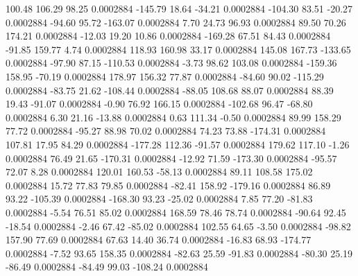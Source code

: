       100.48      106.29       98.25     0.0002884
     -145.79       18.64      -34.21     0.0002884
     -104.30       83.51      -20.27     0.0002884
      -94.60       95.72     -163.07     0.0002884
        7.70       24.73       96.93     0.0002884
       89.50       70.26      174.21     0.0002884
      -12.03       19.20       10.86     0.0002884
     -169.28       67.51       84.43     0.0002884
      -91.85      159.77        4.74     0.0002884
      118.93      160.98       33.17     0.0002884
      145.08      167.73     -133.65     0.0002884
      -97.90       87.15     -110.53     0.0002884
       -3.73       98.62      103.08     0.0002884
     -159.36      158.95      -70.19     0.0002884
      178.97      156.32       77.87     0.0002884
      -84.60       90.02     -115.29     0.0002884
      -83.75       21.62     -108.44     0.0002884
      -88.05      108.68       88.07     0.0002884
       88.39       19.43      -91.07     0.0002884
       -0.90       76.92      166.15     0.0002884
     -102.68       96.47      -68.80     0.0002884
        6.30       21.16      -13.88     0.0002884
        0.63      111.34       -0.50     0.0002884
       89.99      158.29       77.72     0.0002884
      -95.27       88.98       70.02     0.0002884
       74.23       73.88     -174.31     0.0002884
      107.81       17.95       84.29     0.0002884
     -177.28      112.36      -91.57     0.0002884
      179.62      117.10       -1.26     0.0002884
       76.49       21.65     -170.31     0.0002884
      -12.92       71.59     -173.30     0.0002884
      -95.57       72.07        8.28     0.0002884
      120.01      160.53      -58.13     0.0002884
       89.11      108.58      175.02     0.0002884
       15.72       77.83       79.85     0.0002884
      -82.41      158.92     -179.16     0.0002884
       86.89       93.22     -105.39     0.0002884
     -168.30       93.23      -25.02     0.0002884
        7.85       77.20      -81.83     0.0002884
       -5.54       76.51       85.02     0.0002884
      168.59       78.46       78.74     0.0002884
      -90.64       92.45      -18.54     0.0002884
       -2.46       67.42      -85.02     0.0002884
      102.55       64.65       -3.50     0.0002884
      -98.82      157.90       77.69     0.0002884
       67.63       14.40       36.74     0.0002884
      -16.83       68.93     -174.77     0.0002884
       -7.52       93.65      158.35     0.0002884
      -82.63       25.59      -91.83     0.0002884
      -80.30       25.19      -86.49     0.0002884
      -84.49       99.03     -108.24     0.0002884
